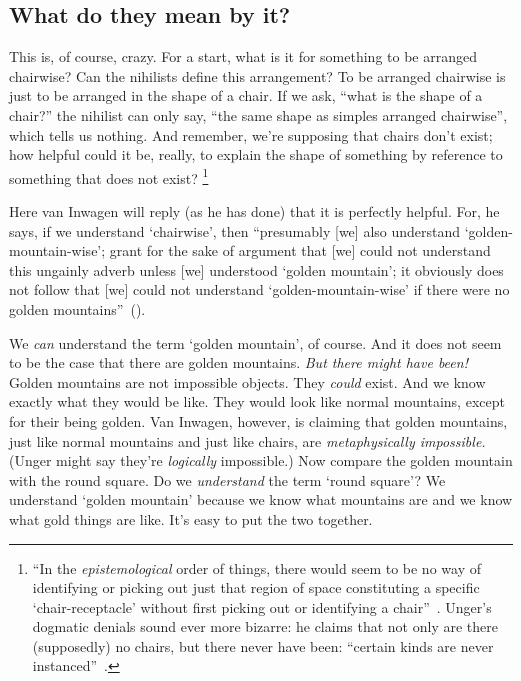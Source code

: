 \documentclass[11pt]{article}
\begin{document}
\begin{spacing}{1.5}
\subsection{What do they mean by it?}
This is, of course, crazy. For a start, what is it for something to be arranged chairwise? Can the nihilists define this arrangement? To be arranged chairwise is just to be arranged in the shape of a chair. If we ask, ``what is the shape of a chair?'' the nihilist can only say, ``the same shape as simples arranged chairwise'', which tells us nothing. And remember, we're supposing that chairs don't exist; how helpful could it be, really, to explain the shape of something by reference to something that does not exist?%
%
\footnote{``In the {\em epistemological} order of things, there would seem to be no way of identifying or picking out just that region of space constituting a specific `chair-receptacle' without first picking out or identifying a chair''~\citep[702]{rosenberg1993}. Unger's dogmatic denials sound ever more bizarre: he claims that not only are there (supposedly) no chairs, but there never have been: ``certain kinds are never instanced''~\citep[147]{unger1979}.}%
%

Here van Inwagen will reply (as he has done) that it is perfectly helpful. For, he says, if we understand `chairwise', then ``presumably [we] also understand `golden-mountain-wise'; grant for the sake of argument that [we] could not understand this ungainly adverb unless [we] understood `golden mountain'; it obviously does not follow that [we] could not understand `golden-mountain-wise' if there were no golden mountains''~(\citeyear[719]{inwagen1993b}).

We {\em can} understand the term `golden mountain', of course. And it does not seem to be the case that there are golden mountains. {\em But there might have been!} Golden mountains are not impossible objects. They {\em could} exist. And we know exactly what they would be like. They would look like normal mountains, except for their being golden. Van Inwagen, however, is claiming that golden mountains, just like normal mountains and just like chairs, are {\em metaphysically impossible.} (Unger might say they're {\em logically} impossible.) Now compare the golden mountain with the round square. Do we {\em understand} the term `round square'? We understand `golden mountain' because we know what mountains are and we know what gold things are like. It's easy to put the two together.


\end{spacing}
\end{document}
